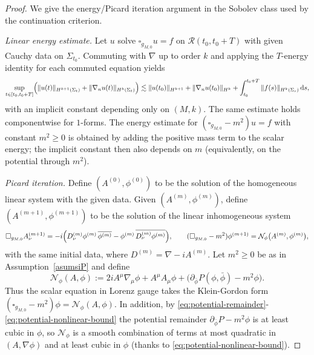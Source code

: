\documentclass[11pt]{article}
\numberwithin{equation}{section}
\theoremstyle{plain}
\theoremstyle{definition}
\theoremstyle{remark}
\newcommand{\dd}{\mathrm{d}}
\begin{document}
\begin{proof}
We give the energy/Picard iteration argument in the Sobolev class used by the continuation criterion.

\smallskip
\noindent\emph{Linear energy estimate.}
Let $u$ solve $\square_{g_{M,0}}u=f$ on $\mathcal R(t_0,t_0+T)$ with given Cauchy data on $\Sigma_{t_0}$.
Commuting with $\nabla$ up to order $k$ and applying the $T$-energy identity for each commuted equation yields
\begin{equation}\label{eq:linear-energy-estimate-schwarzschild}
\sup_{t\in[t_0,t_0+T]}\Bigl(\|u(t)\|_{H^{k+1}(\Sigma_t)}+\|\nabla_n u(t)\|_{H^{k}(\Sigma_t)}\Bigr)
\lesssim
\|u(t_0)\|_{H^{k+1}}+\|\nabla_n u(t_0)\|_{H^{k}}+\int_{t_0}^{t_0+T}\|f(s)\|_{H^{k}(\Sigma_s)}\,\dd s,
\end{equation}
with an implicit constant depending only on $(M,k)$.
The same estimate holds componentwise for $1$-forms. The energy estimate for $(\square_{g_{M,0}}-m^{2})u=f$ with constant $m^{2}\ge0$ is obtained by adding the positive mass term to the scalar energy; the implicit constant then also depends on $m$ (equivalently, on the potential through $m^{2}$).

\smallskip
\noindent\emph{Picard iteration.}
Define $(A^{(0)},\phi^{(0)})$ to be the solution of the homogeneous linear system with the given data.
Given $(A^{(m)},\phi^{(m)})$, define $(A^{(m+1)},\phi^{(m+1)})$ to be the solution of the linear inhomogeneous system
\begin{equation}
\square_{g_{M,0}}A^{(m+1)}_{\nu}=-i\Bigl(D^{(m)}_{\nu}\phi^{(m)}\,\overline{\phi^{(m)}}-\phi^{(m)}\,\overline{D^{(m)}_{\nu}\phi^{(m)}}\Bigr),
\qquad
(\square_{g_{M,0}}-m^{2})\phi^{(m+1)}=\mathcal N_\phi\bigl(A^{(m)},\phi^{(m)}\bigr),
\end{equation}
with the same initial data, where $D^{(m)}=\nabla-iA^{(m)}$.
Let $m^{2}\ge 0$ be as in Assumption~\ref{asumsiP} and define
\begin{equation}
\mathcal N_\phi(A,\phi):=2iA^{\mu}\nabla_{\mu}\phi + A^{\mu}A_{\mu}\phi + \bigl(\partial_{\bar\phi}P(\phi,\bar\phi)-m^{2}\phi\bigr).
\end{equation}
Thus the scalar equation in Lorenz gauge takes the Klein-Gordon form $(\square_{g_{M,0}}-m^{2})\phi=\mathcal N_\phi(A,\phi)$.
In addition, by \eqref{eq:potential-remainder}-\eqref{eq:potential-nonlinear-bound} the potential remainder $\partial_{\bar\phi}P-m^{2}\phi$ is at least cubic in $\phi$, so $\mathcal N_\phi$ is a smooth combination of terms at most quadratic in $(A,\nabla\phi)$ and at least cubic in $\phi$ (thanks to \eqref{eq:potential-nonlinear-bound}).


\end{proof}
\end{document}
